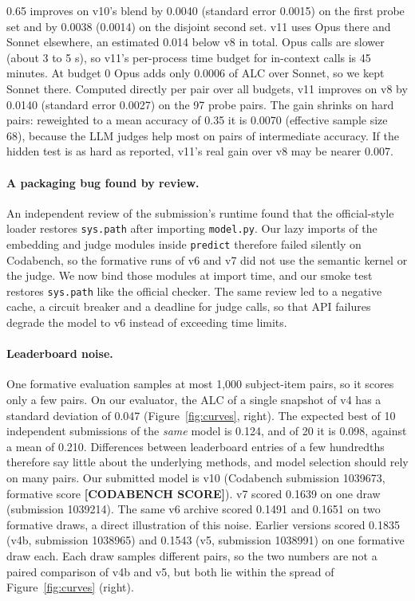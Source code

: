 \documentclass{article}
\newcommand{\CODABENCHID}{1039673}
\newcommand{\CODABENCHSCORE}{\textbf{[CODABENCH SCORE]}}
\begin{document}
0.65 improves on v10's blend by 0.0040 (standard error 0.0015) on the first probe set and by 0.0038
(0.0014) on the disjoint second set. v11 uses Opus there and Sonnet elsewhere, an estimated 0.014 below
v8 in total. Opus calls are slower (about 3 to 5 s), so v11's per-process time budget for in-context
calls is 45 minutes. At budget 0 Opus adds only 0.0006 of ALC over Sonnet, so we kept Sonnet there.
Computed directly per pair over all budgets, v11 improves on v8 by 0.0140 (standard error 0.0027) on
the 97 probe pairs. The gain shrinks on hard pairs: reweighted to a mean accuracy of 0.35 it is
0.0070 (effective sample size 68), because the LLM judges help most on pairs of intermediate accuracy.
If the hidden test is as hard as reported, v11's real gain over v8 may be nearer 0.007.

\paragraph{A packaging bug found by review.} An independent review of the submission's runtime
found that the official-style loader restores \texttt{sys.path} after importing \texttt{model.py}.
Our lazy imports of the embedding and judge modules inside \texttt{predict} therefore failed
silently on Codabench, so the formative runs of v6 and v7 did not use the semantic kernel or the
judge. We now bind those modules at import time, and our smoke test restores \texttt{sys.path} like
the official checker. The same review led to a negative cache, a circuit breaker and a deadline for
judge calls, so that API failures degrade the model to v6 instead of exceeding time limits.

\paragraph{Leaderboard noise.} One formative evaluation samples at most 1,000 subject-item pairs, so
it scores only a few pairs. On our evaluator, the ALC of a single snapshot of v4 has a standard
deviation of 0.047 (Figure~\ref{fig:curves}, right). The expected best of 10 independent submissions of
the \emph{same} model is 0.124, and of 20 it is 0.098, against a mean of 0.210. Differences between
leaderboard entries of a few hundredths therefore say little about the underlying methods, and
model selection should rely on many pairs. Our submitted model is v10 (Codabench submission \CODABENCHID, formative score \CODABENCHSCORE).
v7 scored 0.1639 on one draw (submission 1039214).
The same v6 archive scored 0.1491 and 0.1651 on two formative draws, a direct illustration of this noise. Earlier versions scored 0.1835 (v4b, submission 1038965) and 0.1543 (v5, submission 1038991) on
one formative draw each. Each draw samples different pairs, so the two numbers are not a paired
comparison of v4b and v5, but both lie within the spread of Figure~\ref{fig:curves} (right).
\end{document}
